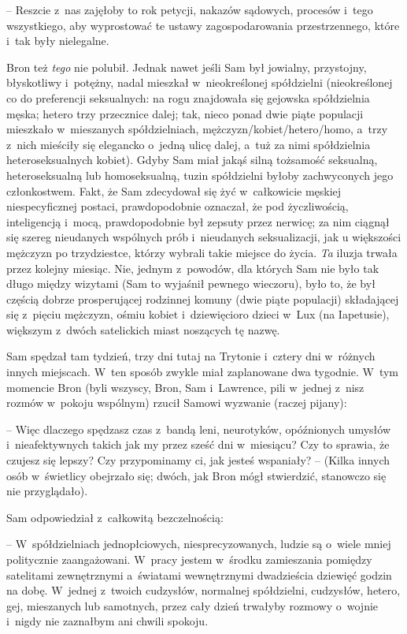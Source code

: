 \documentclass[oneside,polish,11pt,rmheadings]{mwbk}
\begin{document}
-- Reszcie z~nas zajęłoby to rok petycji, nakazów sądowych, procesów i~tego wszystkiego, aby wyprostować te ustawy zagospodarowania przestrzennego, które i~tak były nielegalne. 

Bron też \textit{tego }nie polubił.  Jednak nawet jeśli Sam był jowialny, przystojny, błyskotliwy i~potężny, nadal mieszkał w~nieokreślonej spółdzielni (nieokreślonej co do preferencji seksualnych: na rogu znajdowała się gejowska spółdzielnia męska; hetero trzy przecznice dalej; tak, nieco ponad dwie piąte populacji mieszkało w~mieszanych spółdzielniach, mężczyzn/kobiet/hetero/homo, a~trzy z~nich mieściły się elegancko o~jedną ulicę dalej, a~tuż za nimi spółdzielnia heteroseksualnych kobiet). Gdyby Sam miał jakąś silną tożsamość seksualną, heteroseksualną lub homoseksualną, tuzin spółdzielni byłoby zachwyconych jego członkostwem. Fakt, że Sam zdecydował się żyć w~całkowicie męskiej niespecyficznej postaci, prawdopodobnie oznaczał, że pod życzliwością, inteligencją i~mocą, prawdopodobnie był zepsuty przez nerwicę; za nim ciągnął się szereg nieudanych wspólnych prób i~nieudanych seksualizacji, jak u większości mężczyzn po trzydziestce, którzy wybrali takie miejsce do życia. \textit{Ta } iluzja trwała przez kolejny miesiąc. Nie, jednym z~powodów, dla których Sam nie było tak długo między wizytami (Sam to wyjaśnił pewnego wieczoru), było to, że był częścią dobrze prosperującej rodzinnej komuny (dwie piąte populacji) składającej się z~pięciu mężczyzn, ośmiu kobiet i~dziewięcioro dzieci w~Lux (na Iapetusie), większym z~dwóch satelickich miast noszących tę nazwę.  

Sam spędzał tam tydzień, trzy dni tutaj na Trytonie i~cztery dni w~różnych innych miejscach. W~ten sposób zwykle miał zaplanowane dwa tygodnie.  W~tym momencie Bron (byli wszyscy, Bron, Sam i~Lawrence, pili w~jednej z~nisz rozmów w~pokoju wspólnym) rzucił Samowi wyzwanie (raczej pijany): 

-- Więc dlaczego spędzasz czas z~bandą leni, neurotyków, opóźnionych umysłów i~nieafektywnych takich jak my przez sześć dni w~miesiącu?  Czy to sprawia, że czujesz się lepszy? Czy przypominamy ci, jak jesteś wspaniały?  -- (Kilka innych osób w~świetlicy obejrzało się; dwóch, jak Bron mógł stwierdzić, stanowczo się nie przyglądało). 

Sam odpowiedział z~całkowitą bezczelnością: 

-- W~spółdzielniach jednopłciowych, niesprecyzowanych, ludzie są o~wiele mniej politycznie zaangażowani.  W~pracy jestem w~środku zamieszania pomiędzy satelitami zewnętrznymi a~światami wewnętrznymi dwadzieścia dziewięć godzin na dobę. W~jednej z~twoich cudzysłów, normalnej spółdzielni, cudzysłów, hetero, gej, mieszanych lub samotnych, przez cały dzień trwałyby rozmowy o~wojnie i~nigdy nie zaznałbym ani chwili spokoju. 
\end{document}
